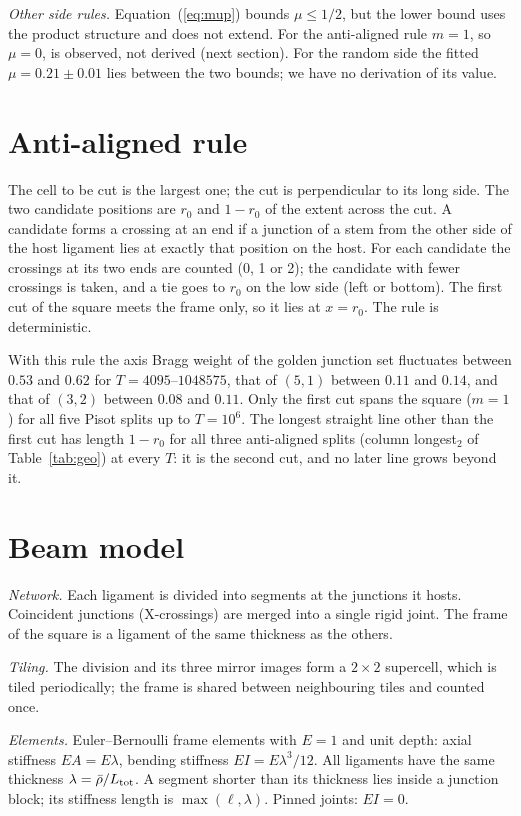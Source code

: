 \documentclass[aps,prl,onecolumn,superscriptaddress,amsmath,amssymb,floatfix]{revtex4-2}
\begin{document}
\textit{Other side rules.} Equation~(\ref{eq:mup}) bounds $\mu\le1/2$, but the lower bound uses
the product structure and does not extend. For the anti-aligned rule $m=1$, so $\mu=0$, is
observed, not derived (next section). For the random side the fitted $\mu=0.21\pm0.01$ lies between
the two bounds; we have no derivation of its value.

\section{Anti-aligned rule}\label{sec:anti}

The cell to be cut is the largest one; the cut is perpendicular to its long side. The two
candidate positions are $r_0$ and $1-r_0$ of the extent across the cut. A candidate forms a
crossing at an end if a junction of a stem from the other side of the host ligament lies at
exactly that position on the host. For each candidate the crossings at its two ends are
counted (0, 1 or 2); the candidate with fewer crossings is taken, and a tie goes to $r_0$ on
the low side (left or bottom). The first cut of the square meets the frame only, so it lies
at $x=r_0$. The rule is deterministic.

With this rule the axis Bragg weight of the golden junction set fluctuates between $0.53$ and
$0.62$ for $T=4095$--$1048575$, that of $(5,1)$ between $0.11$ and $0.14$, and that of $(3,2)$
between $0.08$ and $0.11$. Only the first cut spans the square ($m=1$) for all five Pisot
splits up to $T=10^{6}$. The longest straight line other than the first cut has length
$1-r_0$ for all three anti-aligned splits (column longest$_2$ of Table~\ref{tab:geo}) at
every $T$: it is the second cut, and no later line grows beyond it.

\section{Beam model}

\textit{Network.} Each ligament is divided into segments at the junctions it hosts.
Coincident junctions (X-crossings) are merged into a single rigid joint. The frame of the
square is a ligament of the same thickness as the others.

\textit{Tiling.} The division and its three mirror images form a $2\times2$ supercell, which
is tiled periodically; the frame is shared between neighbouring tiles and counted once.

\textit{Elements.} Euler--Bernoulli frame elements with $E=1$ and unit depth: axial stiffness
$EA=E\lambda$, bending stiffness $EI=E\lambda^{3}/12$. All ligaments have the same thickness
$\lambda=\bar\rho/L_{\rm tot}$. A segment shorter than its thickness lies inside a junction
block; its stiffness length is $\max(\ell,\lambda)$. Pinned joints: $EI=0$.
\end{document}
